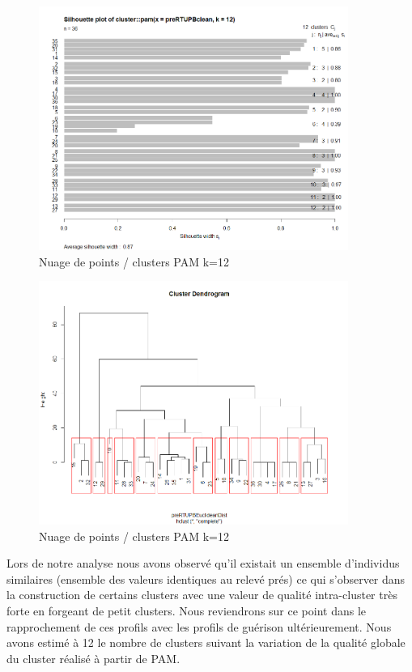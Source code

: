 \begin{figure}[H]
\centering
\includegraphics[width=0.90\textwidth]{../Fig/RTUPB/rtupb-sil-k12-pre.png}
\caption{Nuage de points / clusters PAM k=12 }
\end{figure}

\begin{figure}[H]
\centering
\includegraphics[width=0.90\textwidth]{../Fig/RTUPB/rtupb-cah-k12-pre.png}
\caption{Nuage de points / clusters PAM k=12 }
\end{figure}


%
%

Lors de notre analyse nous avons observé qu'il existait un ensemble d'individus similaires (ensemble des valeurs
identiques au relevé prés) ce qui s'observer dans la construction de certains clusters avec une valeur de qualité 
intra-cluster très forte en forgeant de petit clusters. Nous reviendrons sur ce point dans le rapprochement de ces
profils avec les profils de guérison ultérieurement. Nous avons estimé à 12 le nombre de clusters suivant la variation 
de la qualité globale  du cluster réalisé à partir de PAM. 





